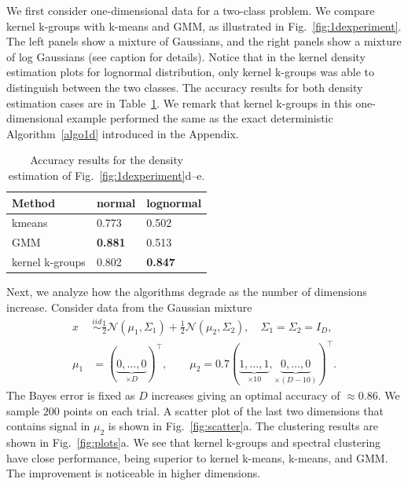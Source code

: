 \documentclass[10pt,journal,compsoc]{IEEEtran}
\begin{document}
We first consider one-dimensional data for a two-class problem. We compare
kernel k-groups with k-means and GMM, as illustrated in 
Fig.~\ref{fig:1dexperiment}. The left panels show a mixture of Gaussians, and the right panels show a mixture of log Gaussians (see caption for details).
Notice that in the kernel density estimation plots
for lognormal distribution, only kernel k-groups was able to distinguish
between the two classes. The accuracy results for both density estimation
cases are in Table~\ref{tb:dens}. We remark that kernel k-groups in
this one-dimensional example performed the same as the exact deterministic
Algorithm~\ref{algo1d} introduced in the Appendix.

\begin{table}[h]
\centering
\caption{
\label{tb:dens} Accuracy results for the density
estimation of Fig.~\ref{fig:1dexperiment}d--e.
}
\begin{tabular}{@{}l|ll@{}}
       Method        & normal & lognormal \\ \midrule[.5pt]
        kmeans       & 0.773  & 0.502     \\
         GMM         & \textbf{0.881}  & 0.513     \\
   kernel k-groups   & 0.802  & \textbf{0.847}  
\end{tabular}
\end{table}



Next, we analyze
how the algorithms degrade as the number of dimensions increase.
Consider data from the Gaussian mixture
\begin{equation}
\label{eq:gauss1}
\begin{split}
x  &\stackrel{iid}{\sim} 
\tfrac{1}{2} \mathcal{N}(\mu_1,\Sigma_1) +
\tfrac{1}{2} \mathcal{N}(\mu_2,\Sigma_2), \quad
\Sigma_1=\Sigma_2 = I_D, \\
\mu_1 &= (\underbrace{0,\dotsc,0}_{\times D})^\top, \qquad
\mu_2 = 0.7 (\underbrace{1,\dots,1}_{\times 10},
\underbrace{0,\dots,0}_{\times (D-10)})^\top.
\end{split}
\end{equation}
The Bayes error is fixed as $D$ increases giving an optimal accuracy
of $\approx 0.86$.
We sample $200$ points on each trial. A scatter plot of the last two
dimensions that contains signal in $\mu_2$ is shown in
Fig.~\ref{fig:scatter}a.
The clustering results are shown in Fig.~\ref{fig:plots}a.
We see that 
kernel k-groups and spectral clustering have close
performance, being superior to kernel k-means, k-means, and GMM.
The improvement is noticeable in 
higher dimensions.
\end{document}

